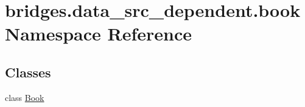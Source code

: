 \hypertarget{namespacebridges_1_1data__src__dependent_1_1book}{}\section{bridges.\+data\+\_\+src\+\_\+dependent.\+book Namespace Reference}
\label{namespacebridges_1_1data__src__dependent_1_1book}
\subsection*{Classes}
\begin{DoxyCompactItemize}
\item 
class \mbox{\hyperlink{classbridges_1_1data__src__dependent_1_1book_1_1_book}{Book}}
\end{DoxyCompactItemize}
